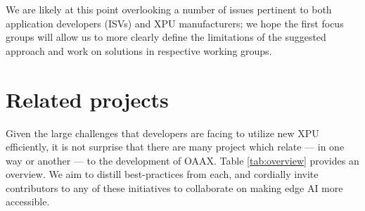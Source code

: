 \documentclass{article}
\begin{document}
We are likely at this point overlooking a number of issues pertinent to both application developers (ISVs) and XPU manufacturers; we hope the first focus groups will allow us to more clearly define the limitations of the suggested approach and work on solutions in respective working groups.

\section{Related projects}

Given the large challenges that developers are facing to utilize new XPU efficiently, it is not surprise that there are many project which relate --- in one way or another --- to the development of OAAX. Table \ref{tab:overview} provides an overview. We aim to distill best-practices from each, and cordially invite contributors to any of these initiatives to collaborate on making edge AI more accessible.
\end{document}
